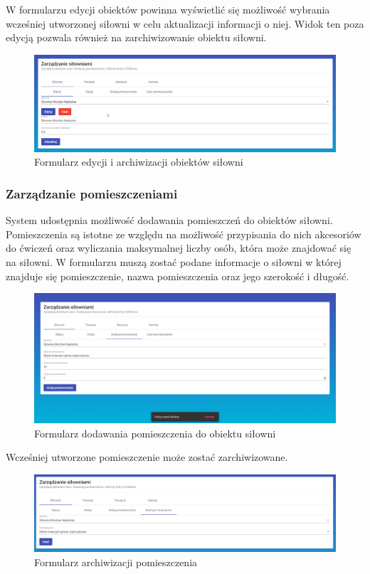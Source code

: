 \documentclass[a4paper,twoside,12pt]{book}
\begin{document}
W formularzu edycji obiektów powinna wyświetlić się możliwość wybrania wcześniej utworzonej siłowni w celu aktualizacji informacji o niej. Widok ten poza edycją pozwala również na zarchiwizowanie obiektu siłowni.
\begin{figure}[H]
	\centering
	\includegraphics[width=1\linewidth]{../zrzuty_ekranu/dzialanie/obiekty/edycja}
	\caption{Formularz edycji i archiwizacji obiektów siłowni}
	\label{fig:edycja}
\end{figure}


\subsubsection{Zarządzanie pomieszczeniami}
System udostępnia możliwość dodawania pomieszczeń do obiektów siłowni. Pomieszczenia są istotne ze względu na możliwość przypisania do nich akcesoriów do ćwiczeń oraz wyliczania maksymalnej liczby osób, która może znajdować się na siłowni. W formularzu muszą zostać podane informacje o siłowni w której znajduje się pomieszczenie, nazwa pomieszczenia oraz jego szerokość i długość.
\begin{figure}[H]
	\centering
	\includegraphics[width=1\linewidth]{../zrzuty_ekranu/dzialanie/pomieszczenia/dodawanie}
	\caption{Formularz dodawania pomieszczenia do obiektu siłowni}
	\label{fig:dodawanie_pomieszczenia}
\end{figure}

Wcześniej utworzone pomieszczenie może zostać zarchiwizowane.
\begin{figure}[H]
	\centering
	\includegraphics[width=1\linewidth]{../zrzuty_ekranu/dzialanie/pomieszczenia/usuwanie}
	\caption{Formularz archiwizacji pomieszczenia}
	\label{fig:archwizacja_pomieszczenia}
\end{figure}
\end{document}
